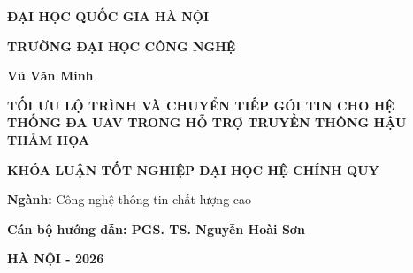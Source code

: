 
\begin{titlepage}
\centering


{\normalsize\textbf{ĐẠI HỌC QUỐC GIA HÀ NỘI}\par}
{\normalsize\textbf{TRƯỜNG ĐẠI HỌC CÔNG NGHỆ}\par}
\vspace{3cm}

{\normalsize\bfseries Vũ Văn Minh\par}

\vspace{2cm}

{\large\bfseries \MakeUppercase{Tối ưu lộ trình và chuyển tiếp gói tin cho hệ thống đa UAV trong hỗ trợ truyền thông hậu thảm họa} \par}

\vspace{2cm}

{\normalsize\bfseries KHÓA LUẬN TỐT NGHIỆP ĐẠI HỌC HỆ CHÍNH QUY}

{\normalsize \textbf{Ngành:} Công nghệ thông tin chất lượng cao\par}

\vspace{2cm}

{\begin{flushleft}
    \normalsize\bfseries Cán bộ hướng dẫn: PGS. TS. Nguyễn Hoài Sơn
\end{flushleft}}





\vfill
{\normalsize\bfseries HÀ NỘI - 2026\par}
\end{titlepage}
\newpage